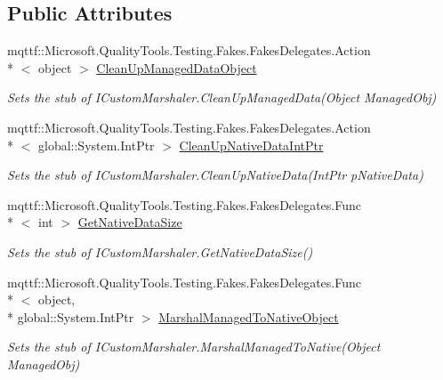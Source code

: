 \subsection*{Public Attributes}
\begin{DoxyCompactItemize}
\item 
mqttf\-::\-Microsoft.\-Quality\-Tools.\-Testing.\-Fakes.\-Fakes\-Delegates.\-Action\\*
$<$ object $>$ \hyperlink{class_system_1_1_runtime_1_1_interop_services_1_1_fakes_1_1_stub_i_custom_marshaler_a1392261f9f891ab870d785a8a63b0648}{Clean\-Up\-Managed\-Data\-Object}
\begin{DoxyCompactList}\small\item\em Sets the stub of I\-Custom\-Marshaler.\-Clean\-Up\-Managed\-Data(\-Object Managed\-Obj)\end{DoxyCompactList}\item 
mqttf\-::\-Microsoft.\-Quality\-Tools.\-Testing.\-Fakes.\-Fakes\-Delegates.\-Action\\*
$<$ global\-::\-System.\-Int\-Ptr $>$ \hyperlink{class_system_1_1_runtime_1_1_interop_services_1_1_fakes_1_1_stub_i_custom_marshaler_ad7d7d9d426391adfad9b289a4a6b7569}{Clean\-Up\-Native\-Data\-Int\-Ptr}
\begin{DoxyCompactList}\small\item\em Sets the stub of I\-Custom\-Marshaler.\-Clean\-Up\-Native\-Data(\-Int\-Ptr p\-Native\-Data)\end{DoxyCompactList}\item 
mqttf\-::\-Microsoft.\-Quality\-Tools.\-Testing.\-Fakes.\-Fakes\-Delegates.\-Func\\*
$<$ int $>$ \hyperlink{class_system_1_1_runtime_1_1_interop_services_1_1_fakes_1_1_stub_i_custom_marshaler_a29e246c8d21832eef44f036620a119ba}{Get\-Native\-Data\-Size}
\begin{DoxyCompactList}\small\item\em Sets the stub of I\-Custom\-Marshaler.\-Get\-Native\-Data\-Size()\end{DoxyCompactList}\item 
mqttf\-::\-Microsoft.\-Quality\-Tools.\-Testing.\-Fakes.\-Fakes\-Delegates.\-Func\\*
$<$ object, \\*
global\-::\-System.\-Int\-Ptr $>$ \hyperlink{class_system_1_1_runtime_1_1_interop_services_1_1_fakes_1_1_stub_i_custom_marshaler_a889ebc84b40cf6c93f38d2f57e22c1e0}{Marshal\-Managed\-To\-Native\-Object}
\begin{DoxyCompactList}\small\item\em Sets the stub of I\-Custom\-Marshaler.\-Marshal\-Managed\-To\-Native(\-Object Managed\-Obj)\end{DoxyCompactList}\item 

\end{DoxyCompactItemize}
